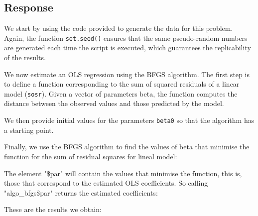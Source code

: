 \documentclass[12pt,letterpaper]{article}
\begin{document}
\subsection*{Response}

\noindent We start by using the code provided to generate the data for this problem. Again, the function \texttt{set.seed()} ensures that the same pseudo-random numbers are generated each time the script is executed, which guarantees the replicability of the results.

\vspace{.5cm}
 
\vspace{0.2in}

\noindent We now estimate an OLS regression using the BFGS algorithm. The first step is to define a function corresponding to the sum of squared residuals of a linear model (\texttt{sosr}). Given a vector of parameters beta, the function computes the distance between the observed values and those predicted by the model.\\


\vspace{0.2in}

\noindent We then provide initial values for the parameters \texttt{beta0} so that the algorithm has a starting point.\\


\vspace{0.2in}

\noindent Finally, we use the BFGS algorithm to find the values of beta that minimise the function for the sum of residual squares for lineal model:\\


\vspace{0.2in}

\noindent The element "\$par" will contain the values that minimise the function, this is, those that correspond to the estimated OLS coefficients. So calling "algo\_bfgs\$par" returns the estimated coefficients:\\


\vspace{0.2in}

\noindent These are the results we obtain:\\
\end{document}
